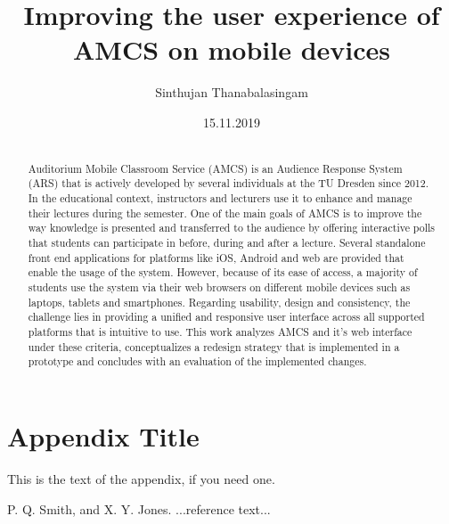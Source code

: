 \documentclass[ngerman]{tudscrreprt}
\begin{document}
	\date{15.11.2019}
	\author{Sinthujan Thanabalasingam}
	\title{Improving the user experience of AMCS on mobile devices}
	\maketitle
	
\begin{abstract}
\section*{\abstractname}
Auditorium Mobile Classroom Service (AMCS) is an Audience Response System (ARS) that is actively developed by several individuals at the TU Dresden since 2012. In the educational context, instructors and lecturers use it to enhance and manage their lectures during the semester. One of the main goals of AMCS is to improve the way knowledge is presented and transferred to the audience by offering interactive polls that students can participate in before, during and after a lecture.
Several standalone front end applications for platforms like iOS, Android and web are provided that enable the usage of the system. However, because of its ease of access, a majority of students use the system via their web browsers on different mobile devices such as laptops, tablets and smartphones. 
Regarding usability, design and consistency, the challenge lies in providing a unified and responsive user interface across all supported platforms that is intuitive to use. This work analyzes AMCS and it's web interface under these criteria, conceptualizes a redesign strategy that is implemented in a prototype and concludes with an evaluation of the implemented changes.
	
\end{abstract}

\cleardoublepage


\tableofcontents








\appendix
\section{Appendix Title}

This is the text of the appendix, if you need one.






\begin{thebibliography}{}
	
	P. Q. Smith, and X. Y. Jones. ...reference text...
	
\end{thebibliography}
\end{document}
